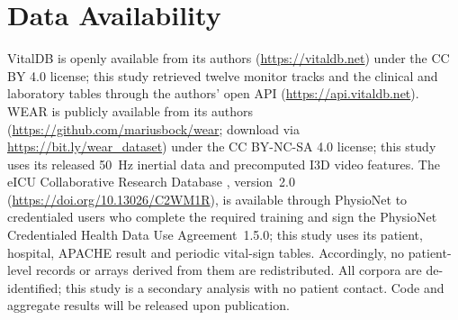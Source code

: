 \section*{Data Availability}
VitalDB \cite{ref20} is openly available from its authors
(\url{https://vitaldb.net}) under the CC BY 4.0 license; this study retrieved
twelve monitor tracks and the clinical and laboratory tables through the
authors' open API (\url{https://api.vitaldb.net}). WEAR
\cite{ref21} is publicly available from its authors
(\url{https://github.com/mariusbock/wear}; download via
\url{https://bit.ly/wear_dataset}) under the CC BY-NC-SA 4.0 license; this
study uses its released 50~Hz inertial data and precomputed I3D video features.
The eICU Collaborative Research Database \cite{ref27}, version~2.0
(\url{https://doi.org/10.13026/C2WM1R}), is available through PhysioNet
\cite{ref28} to credentialed users who complete the required training and sign
the PhysioNet Credentialed Health Data Use Agreement~1.5.0; this study uses its
patient, hospital, APACHE result and periodic vital-sign tables. Accordingly, no patient-level records or arrays derived from them are
redistributed. All corpora are de-identified; this study is a secondary
analysis with no patient contact. Code and aggregate results will be released
upon publication.

